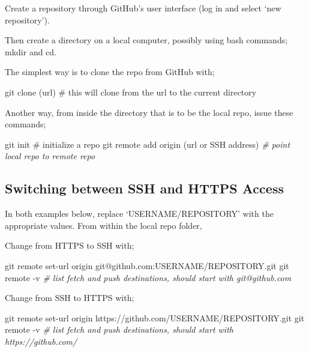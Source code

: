 \documentclass[]{article}
\newenvironment{Shaded}{\begin{snugshade}}{\end{snugshade}}
\newcommand{\CommentTok}[1]{\textcolor[rgb]{0.56,0.35,0.01}{\textit{#1}}}
\newcommand{\FunctionTok}[1]{\textcolor[rgb]{0.00,0.00,0.00}{#1}}
\newcommand{\ExtensionTok}[1]{#1}
\newcommand{\NormalTok}[1]{#1}
\begin{document}
Create a repository through GitHub's user interface (log in and select
`new repository').

Then create a directory on a local computer, possibly using bash
commands; mkdir and cd.

The simplest way is to clone the repo from GitHub with;

\begin{Shaded}
\begin{Highlighting}[]
\FunctionTok{git}\NormalTok{ clone (url)     # }\ExtensionTok{this}\NormalTok{ will clone from the url to the current directory}
\end{Highlighting}
\end{Shaded}

Another way, from inside the directory that is to be the local repo,
issue these commands;

\begin{Shaded}
\begin{Highlighting}[]
\FunctionTok{git}\NormalTok{ init   # initialize a repo}
\FunctionTok{git}\NormalTok{ remote add origin (url or SSH address) }\CommentTok{# point local repo to remote repo}
\end{Highlighting}
\end{Shaded}

\subsection{Switching between SSH and HTTPS Access}\label{sec:SwitchingHTTPStoSSH}

In both examples below, replace `USERNAME/REPOSITORY' with the
appropriate values. From within the local repo folder,

Change from HTTPS to SSH with;

\begin{Shaded}
\begin{Highlighting}[]
\FunctionTok{git}\NormalTok{ remote set-url origin git@github.com:USERNAME/REPOSITORY.git}
\FunctionTok{git}\NormalTok{ remote -v }\CommentTok{# list fetch and push destinations, should start with git@github.com}
\end{Highlighting}
\end{Shaded}

Change from SSH to HTTPS with;

\begin{Shaded}
\begin{Highlighting}[]
\FunctionTok{git}\NormalTok{ remote set-url origin https://github.com/USERNAME/REPOSITORY.git}
\FunctionTok{git}\NormalTok{ remote -v }\CommentTok{# list fetch and push destinations, should start with https://github.com/}
\end{Highlighting}
\end{Shaded}
\end{document}
